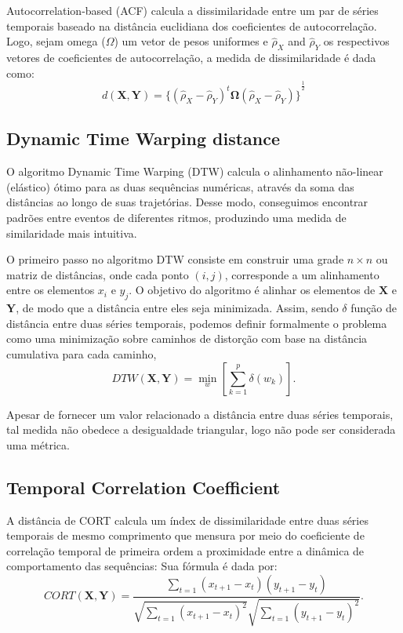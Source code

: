 \documentclass[10pt]{article}
\begin{document}
Autocorrelation-based (ACF) calcula a dissimilaridade entre um par de séries temporais baseado na distância euclidiana dos coeficientes de autocorrelação.
Logo, sejam omega (\(\Omega\)) um vetor de pesos uniformes e \(\hat{\rho}_{X}\) and \(\hat{\rho}_{Y}\) os respectivos vetores de coeficientes de autocorrelação, a medida de dissimilaridade é dada como:
\begin{equation*}
    d(\bm X, \bm Y) = {\{ ( \hat{\rho}_{X} - \hat{\rho}_{Y})^t \bm{\Omega} (\hat{\rho}_{X} - \hat{\rho}_{Y} ) \}}^\frac{1}{2}
\end{equation*}

\subsection*{Dynamic Time Warping distance} \label{DTW}

O algoritmo Dynamic Time Warping (DTW) calcula o alinhamento não-linear (elástico) ótimo para as duas sequências numéricas, através da soma das distâncias ao longo de suas trajetórias.
Desse modo, conseguimos encontrar padrões entre eventos de diferentes ritmos, produzindo uma medida de similaridade mais intuitiva.

O primeiro passo no algoritmo DTW consiste em construir uma grade $n \times n$ ou matriz de distâncias, onde cada ponto $(i, j)$, corresponde a um alinhamento entre os elementos $x_i$ e $y_j$.
O objetivo do algoritmo é alinhar os elementos de $\bm X$ e $\bm Y$, de modo que a distância entre eles seja minimizada.
Assim, sendo $\delta$ função de distância entre duas séries temporais, podemos definir formalmente o problema como uma minimização sobre caminhos de distorção com base na distância cumulativa para cada caminho,
\begin{equation*}
    DTW(\bm X, \bm Y) = \min_w \left[ \sum_{k = 1}^{p} \delta(w_k) \right].
\end{equation*}

Apesar de fornecer um valor relacionado a distância entre duas séries temporais, tal medida não obedece a desigualdade triangular, logo não pode ser considerada uma métrica. 

\subsection*{Temporal Correlation Coefficient} \label{CORT}

A distância de CORT calcula um índex de dissimilaridade entre duas séries temporais de mesmo comprimento que mensura por meio do coeficiente de correlação temporal de primeira ordem a proximidade entre a dinâmica de comportamento das sequências:
Sua fórmula é dada por:
\begin{equation*}
    CORT(\bm X, \bm Y) = \frac{ \sum_{t=1} (x_{t+1} - x_t) ( y_{t+1} - y_t) }{ \sqrt{ \sum_{t=1} (x_{t+1} - x_t)^2} \sqrt{ \sum_{t=1} (y_{t+1} - y_t)^2 }}.
\end{equation*}
\end{document}
